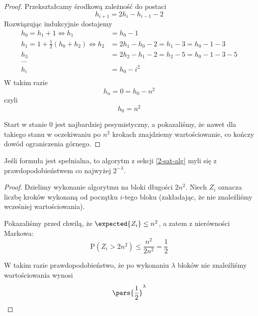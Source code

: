 \begin{proof}
    Przekształcamy środkową zależność do postaci
    \[
        h_{i + 1} = 2h_i - h_{i - 1} - 2
    \]
    Rozwiązując indukcyjnie dostajemy
    \begin{align*}
        h_0 = h_1 + 1 \iff h_1 &= h_0 - 1 \\
        h_1 = 1 + \frac{1}{2}(h_0 + h_2) \iff h_2 &= 2h_1 - h_0 - 2 = h_1 - 3 = h_0 - 1 - 3 \\
        h_3 &= 2h_2 - h_1 - 2 = h_2 - 5 = h_0 - 1 - 3 - 5 \\
        \dots \\ 
        h_i &= h_0 - i^2 \\
    \end{align*}
    W takim razie
    \[
        h_n = 0 = h_0 - n^2
    \]
    czyli \[ h_0 = n^2 \]
    
    Start w stanie 0 jest najbardziej pesymistyczny, a pokazaliśmy, że nawet dla takiego stanu w oczekiwaniu po \( n^2 \) krokach znajdziemy wartościowanie, co kończy dowód ograniczenia górnego. 
\end{proof}

\begin{theorem}[Lemat 7.2 P\&C]
    Jeśli formuła jest spełnialna, to algorytm z sekcji \ref{2-sat-alg} myli się z prawdopodobieństwem co najwyżej \( 2^{-\lambda} \).
\end{theorem}
\begin{proof}
    Dzielimy wykonanie algorytmu na bloki długości \( 2n^2 \).
    Niech \( Z_i \) oznacza liczbę kroków wykonaną od początku \( i \)-tego bloku (zakładając, że nie znaleźliśmy wcześniej wartościowania).
    
    Pokazaliśmy przed chwilą, że \(\expected{Z_i} \leq n^2\), a zatem z nierówności Markowa:
    \[
        \mathrm{P}(Z_i > 2n^2) \leq \frac{n^2}{2n^2} = \frac{1}{2}
    \]
    
    W takim razie prawdopodobieństwo, że po wykonaniu \( \lambda \) bloków nie znaleźliśmy wartościowania wynosi
    \[
        \pars{\frac{1}{2}}^\lambda
    \]
    
\end{proof}